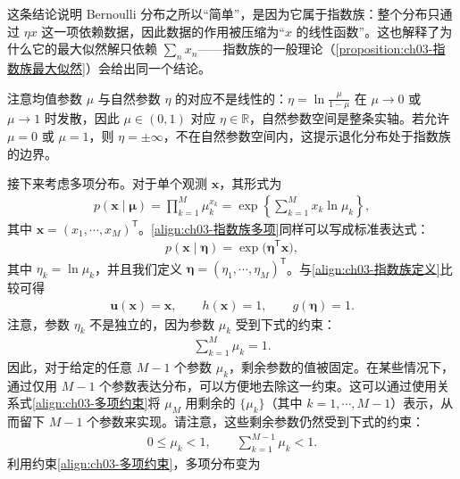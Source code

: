 \documentclass[../../main.tex]{subfiles}
\begin{document}
\begin{remark}
这条结论说明 Bernoulli 分布之所以“简单”，是因为它属于指数族：整个分布只通过 $\eta x$ 这一项依赖数据，因此数据的作用被压缩为“$x$ 的线性函数”。这也解释了为什么它的最大似然解只依赖 $\sum_n x_n$——指数族的一般理论（\cref{proposition:ch03-指数族最大似然}）会给出同一个结论。

注意均值参数 $\mu$ 与自然参数 $\eta$ 的对应不是线性的：$\eta=\ln\frac{\mu}{1-\mu}$ 在 $\mu\to0$ 或 $\mu\to1$ 时发散，因此 $\mu\in(0,1)$ 对应 $\eta\in\mathbb{R}$，自然参数空间是整条实轴。若允许 $\mu=0$ 或 $\mu=1$，则 $\eta=\pm\infty$，不在自然参数空间内，这提示退化分布处于指数族的边界。
\end{remark}

接下来考虑多项分布。对于单个观测 $\boldsymbol{x}$，其形式为
\begin{align}
p(\boldsymbol{x}\mid\boldsymbol{\mu})=\prod_{k=1}^{M}\mu_k^{x_k}=\exp\left\{\sum_{k=1}^{M}x_k\ln\mu_k\right\},
\label{align:ch03-指数族多项}
\end{align}
其中 $\boldsymbol{x}=(x_1,\cdots,x_M)^{\mathsf{T}}$。\eqref{align:ch03-指数族多项}同样可以写成标准表达式：
\begin{align}
p(\boldsymbol{x}\mid\boldsymbol{\eta})=\exp\bigl(\boldsymbol{\eta}^{\mathsf{T}}\boldsymbol{x}\bigr),
\label{align:ch03-多项指数族}
\end{align}
其中 $\eta_k=\ln\mu_k$，并且我们定义 $\boldsymbol{\eta}=(\eta_1,\cdots,\eta_M)^{\mathsf{T}}$。与\eqref{align:ch03-指数族定义}比较可得
\begin{align}
\boldsymbol{u}(\boldsymbol{x})=\boldsymbol{x},\qquad h(\boldsymbol{x})=1,\qquad g(\boldsymbol{\eta})=1.
\label{align:ch03-多项指数族参数}
\end{align}
注意，参数 $\eta_k$ 不是独立的，因为参数 $\mu_k$ 受到下式的约束：
\begin{align}
\sum_{k=1}^{M}\mu_k=1.
\label{align:ch03-多项约束}
\end{align}
因此，对于给定的任意 $M-1$ 个参数 $\mu_k$，剩余参数的值被固定。在某些情况下，通过仅用 $M-1$ 个参数表达分布，可以方便地去除这一约束。这可以通过使用关系式\eqref{align:ch03-多项约束}将 $\mu_M$ 用剩余的 $\{\mu_k\}$（其中 $k=1,\cdots,M-1$）表示，从而留下 $M-1$ 个参数来实现。请注意，这些剩余参数仍然受到下式的约束：
\begin{align}
0\leqslant\mu_k<1,\qquad \sum_{k=1}^{M-1}\mu_k<1.
\label{align:ch03-多项剩余约束}
\end{align}
利用约束\eqref{align:ch03-多项约束}，多项分布变为
\end{document}
